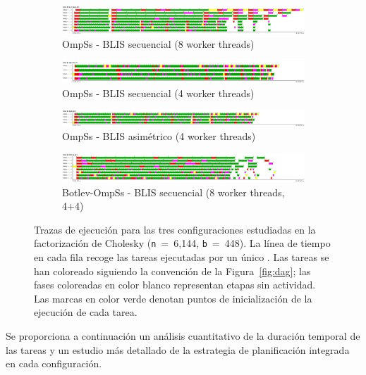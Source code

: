 \begin{figure}%
\centering
	\begin{subfigure}{\textwidth}
   \includegraphics[width=\textwidth]{Plots/Traces/sym_8cores_tasks.png}
		\caption{OmpSs - BLIS secuencial (8 worker threads)} 
	\end{subfigure}
	\begin{subfigure}{\textwidth}
   \includegraphics[width=\textwidth]{Plots/Traces/sym_tasks.png}
 \caption{OmpSs - BLIS secuencial (4 worker threads)} 
	\end{subfigure}
	\begin{subfigure}{\textwidth}
   \includegraphics[width=\textwidth]{Plots/Traces/asym_tasks.png}
		\caption{OmpSs - BLIS asimétrico (4 worker threads)}
	\end{subfigure}
	\begin{subfigure}{\textwidth}
   \includegraphics[width=\textwidth]{Plots/Traces/botlev_tasks.png}
		\caption{Botlev-OmpSs - BLIS secuencial (8 worker threads, 4+4)}
	\end{subfigure}
	\caption[Trazas de ejecución para las tres configuraciones estudiadas en la factorización de Cholesky ({\tt n}~=~6,144, {\tt b}~=~448).]
	{Trazas de ejecución para las tres configuraciones estudiadas en la factorización de Cholesky ({\tt n}~=~6,144, 
{\tt b}~=~448). 
La línea de tiempo en cada fila recoge las tareas ejecutadas por un único \wt.
Las tareas se han coloreado siguiendo la convención de la Figura~\ref{fig:dag};
las fases coloreadas en color blanco representan etapas sin actividad. Las marcas en color
	verde denotan puntos de inicialización de la ejecución de cada tarea.
}
\label{fig:traces_tasks}
\end{figure}


Se proporciona a continuación un análisis cuantitativo de la duración temporal de las tareas y un estudio
más detallado de la estrategia de planificación integrada en cada configuración.

